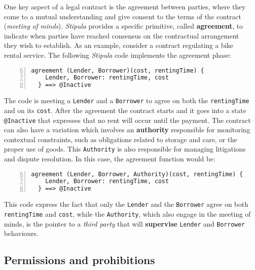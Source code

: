 One key aspect of a legal contract is the agreement between parties, where they come to a mutual 
understanding and give consent to the terms of the contract (\textit{meeting of minds}). \textit{Stipula} 
provides a specific primitive, called \textbf{agreement}, to indicate when parties have reached consensus 
on the contractual arrangement they wish to establish. As an example, consider a contract regulating a 
bike rental service. The following \textit{Stipula} code implements the agreement phase:

\begin{Verbatim}[numbers=left,xleftmargin=1cm,firstnumber=6,breaklines=true,breakanywhere=true,tabsize=2]
  agreement (Lender, Borrower)(cost, rentingTime) {
    Lender, Borrower: rentingTime, cost 
  } ==> @Inactive
\end{Verbatim}

The code is meeting a \verb|Lender| and a \verb|Borrower| to agree on both the \verb|rentingTime| and on 
its \verb|cost|. After the agreement the contract starts and it goes into a state \verb|@Inactive| that 
expresses that no rent will occur until the payment. The contract can also have a variation which involves 
an \textbf{authority} responsible for monitoring contextual constraints, such as obligations related to 
storage and care, or the proper use of goods. This \verb|Authority| is also responsible for managing 
litigations and dispute resolution. In this case, the agreement function would be:

\begin{Verbatim}[numbers=left,xleftmargin=1cm,firstnumber=6,breaklines=true,breakanywhere=true,tabsize=2]
  agreement (Lender, Borrower, Authority)(cost, rentingTime) {
    Lender, Borrower: rentingTime, cost 
  } ==> @Inactive
\end{Verbatim}

This code express the fact that only the \verb|Lender| and the \verb|Borrower| agree on both 
\verb|rentingTime| and \verb|cost|, while the \verb|Authority|, which also engage in the meeting of minds, 
is the pointer to a \textit{third party} that will \textbf{supervise} \verb|Lender| and \verb|Borrower| 
behaviours.

\subsection{Permissions and prohibitions}

